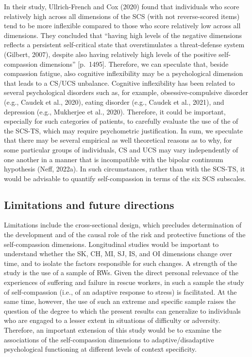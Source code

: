 \documentclass[
  man]{apa7}
\begin{document}
In their study, Ullrich-French and Cox (2020) found that
individuals who score relatively high across all dimensions of the SCS (with not reverse-scored items) tend to be more inflexible compared to those who score relatively low across all dimensions. They concluded that ``having high levels of the negative dimensions reflects a persistent self-critical state that overstimulates a threat-defense system (Gilbert, 2007), despite also having relatively high levels of the positive self-compassion dimensions'' {[}p.~1495{]}. Therefore, we can speculate that, beside compassion fatigue, also cognitive inflexibility may be a psychological dimension that leads to a CS/UCS unbalance. Cognitive inflexibility has been related to several psychological disorders such as, for example, obsessive-compulsive disorder (e.g., Caudek et al., 2020), eating disorder (e.g., Caudek et al., 2021), and depression (e.g., Mukherjee et al., 2020). Therefore, it could be important, especially for such categories of patients, to carefully evaluate the use of the of the SCS-TS, which may require psychometric justification. In sum, we speculate that there may be several empirical as well theoretical reasons as to why, for some particular groups of individuals, CS and UCS may vary independently of one another in a manner that is incompatible with the bipolar continuum hypothesis (Neff, 2022a). In such circumstances, rather than with the SCS-TS, it would be advisable to quantify self-compassion in terms of the six SCS subscales.

\hypertarget{limitations-and-future-directions}{%
\subsection{Limitations and future directions}\label{limitations-and-future-directions}}

Limitations include the cross-sectional design, which precludes determination of the development and of the causal role of the risk and protective functions of the self-compassion dimensions. Longitudinal studies would be important to understand whether the SK, CH, MI, SJ, IS, and OI dimensions change over time, and to isolate the factors responsible for such changes.
A strength of the study is the use of a sample of RWs. Given the direct personal relevance of the experiences of suffering and failure in rescue workers, in such a sample the study of self-compassion (i.e., of an adaptive response to stress) is facilitated. At the same time, however, the use of such an extreme and specific sample raises the question of the degree to which the present results can generalize to individuals who are engaged to a lesser extent in situations of difficulty or adversity. Therefore, an important extension of this study would be to examine the associations of the self-compassion dimensions to adaptive/disadaptive psychological functioning at different levels of context specificity.
\end{document}
